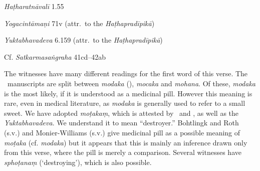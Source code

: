 \begin{ekdosis}
\begin{testimonia}[hp02_033]
\emph{Haṭharatnāvalī} 1.55

\begin{versinnote}
\end{versinnote}

\emph{Yogacintāmaṇi} 71v (attr.~to the \emph{Haṭhapradīpikā})

\begin{versinnote}
\end{versinnote}

\emph{Yuktabhavadeva} 6.159 (attr.~to the \emph{Haṭhapradīpikā})

\begin{versinnote}
\end{versinnote}

Cf. \emph{Satkarmasaṅgraha} 41cd–42ab

\begin{versinnote}
\end{versinnote}
\end{testimonia}

\begin{philcomm}[hp02_033]
The witnesses have many different readings for the first word of this verse. The \textalpha\ manuscripts are split between \emph{modaka} (\alphaOne), \emph{mocaka} and \emph{mohana}. Of these, \emph{modaka} is the most likely, if it is understood as a medicinal pill. However this meaning is rare, even in medical literature, as \emph{modaka} is generally used to refer to a small sweet. We have adopted \emph{moṭakaṃ}, which is attested by \etaOne\ and \deltaTwo, as well as the \emph{Yuktabhavadeva}. We understand it to mean “destroyer.” Bohtlingk and Roth (s.v.) and Monier-Williams (s.v.) give medicinal pill as a possible meaning of \emph{moṭaka} (cf. \emph{modaka}) but it appears that this is mainly an inference drawn only from this verse, where the pill is merely a comparison. Several witnesses have \emph{sphoṭanaṃ} (‘destroying’), which is also possible. 


\end{philcomm}
\end{ekdosis}

